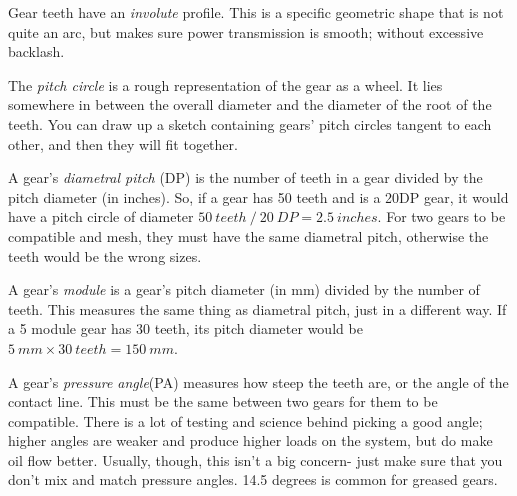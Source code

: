 \begin{asparaenum}[a)]
	\item Gear teeth have an \textit{involute} profile. This is a specific geometric shape that is not quite an arc, but makes sure power transmission is smooth; without excessive backlash.
	\item The \textit{pitch circle} is a rough representation of the gear as a wheel. It lies somewhere in between the overall diameter and the diameter of the root of the teeth. You can draw up a sketch containing gears' pitch circles tangent to each other, and then they will fit together.
	\item A gear's \textit{diametral pitch} (DP) is the number of teeth in a gear divided by the pitch diameter (in inches). So, if a gear has 50 teeth and is a 20DP gear, it would have a pitch circle of diameter $50 \ teeth \ / \ 20 \ DP = 2.5 \ inches$. For two gears to be compatible and mesh, they must have the same diametral pitch, otherwise the teeth would be the wrong sizes.
	\item A gear's \textit{module} is a gear's pitch diameter (in mm) divided by the number of teeth. This measures the same thing as diametral pitch, just in a different way. If a 5 module gear has 30 teeth, its pitch diameter would be $5 \ mm \times 30 \ teeth = 150 \ mm$.
	\item A gear's \textit{pressure angle}(PA) measures how steep the teeth are, or the angle of the contact line. This must be the same between two gears for them to be compatible. There is a lot of testing and science behind picking a good angle; higher angles are weaker and produce higher loads on the system, but do make oil flow better. Usually, though, this isn't a big concern- just make sure that you don't mix and match pressure angles. 14.5 degrees is common for greased gears.
\end{asparaenum}

